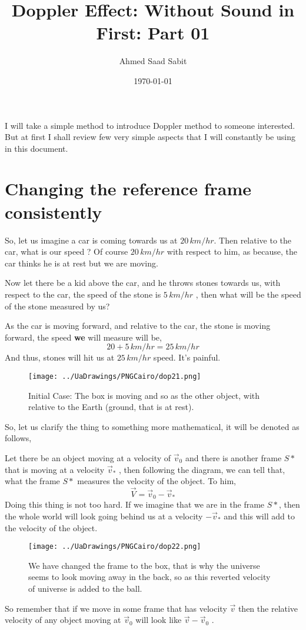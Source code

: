 \documentclass[a4paper]{article}
\title{Doppler Effect: Without Sound in First: Part 01 }
\author{Ahmed Saad Sabit }
\date{\today}
\begin{document}
\maketitle
    I will take a simple method to introduce Doppler method to someone interested. But at first I shall review few very simple aspects that
I will constantly be using in this document. \\
\section{Changing the reference frame consistently}
So, let us imagine a car is coming towards us at $20 \, km/hr$. Then relative to the car, what is our speed ? Of course $20 \, km/hr$  with 
respect
to him, as because, the car thinks he is at rest but we are moving.

Now let there be a kid above the car, and he throws stones towards us, with respect to the car, the speed of the stone is 
$5 \, km/hr$  , then what will be the 
speed of the stone measured by us? 

As the car is moving forward, and relative to the car, the stone is moving forward, the speed \textbf{we} will measure will be, 
\[ 20 + 5 \, km/hr = 25 \, km/hr\]  
And thus, stones will hit us at $25 \, km/hr$  speed. It's painful. 
\begin{figure}[hbtp]
 \centering
 \texttt{[image: ../UaDrawings/PNGCairo/dop21.png]}
 \caption{Initial Case: The box is moving and so as the other object, with relative to the Earth (ground, that is at rest).}
 \end{figure}
  
So, let us clarify the thing to something more mathematical, it will be denoted as follows, 

Let there be an object moving at a velocity of $\vec{v}_0 $  and there is another frame $S*$  that is moving at a velocity $\vec{v}_*$  , then following
the diagram, we can tell that, what the frame $S*$  measures the velocity of the object. To him, 
\begin{equation}
\vec{V} = \vec{v}_0 - \vec{v}_* 
\end{equation}
Doing this thing is not too hard. If we imagine that we are in the frame $S*$, then the whole world will look going behind us 
at a velocity $-\vec{v}_*$  and this will add to the velocity of the object. \\
\begin{figure}[hbtp]
 \centering 
 \texttt{[image: ../UaDrawings/PNGCairo/dop22.png]}
 \caption{We have changed the frame to the box, that is why the universe seems to look moving away in the back, so as this reverted velocity of universe is added to the ball.}
\end{figure} 
So remember that if we move in some frame that has velocity $\vec{v}$  then the relative velocity of any object moving at 
$\vec{v}_0 $  will look like $\vec{v} - \vec{v}_0$  . \\  
\end{document}
